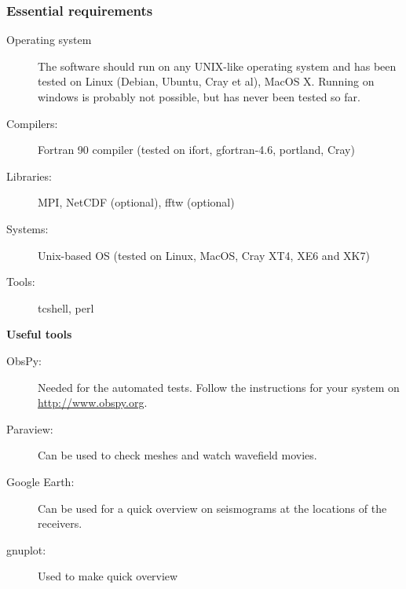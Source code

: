 \documentclass{article}
\begin{document}
\subsubsection{Essential requirements}
\begin{description}
 \item[Operating system] The software should run on any UNIX-like operating system and has been tested on Linux (Debian, Ubuntu, Cray et al), MacOS X. Running on windows is probably not possible, but has never been tested so far.
 \item[Compilers:] Fortran 90 compiler (tested on ifort, gfortran-4.6,
   portland, Cray)
 \item[Libraries:] MPI, NetCDF (optional), fftw (optional)
 \item[Systems:] Unix-based OS (tested on Linux, MacOS, Cray XT4, XE6 and XK7)
 \item[Tools:] tcshell, perl
\end{description}\vspace*{0.3cm}
\textbf{Useful tools}
\begin{description}
 \item[ObsPy:] Needed for the automated tests. Follow the instructions for your system on \url{http://www.obspy.org}.
 \item[Paraview:] Can be used to check meshes and watch wavefield movies.
 \item[Google Earth:] Can be used for a quick overview on seismograms at the locations of the receivers.
 \item[gnuplot:] Used to make quick overview
\end{description}
\end{document}
